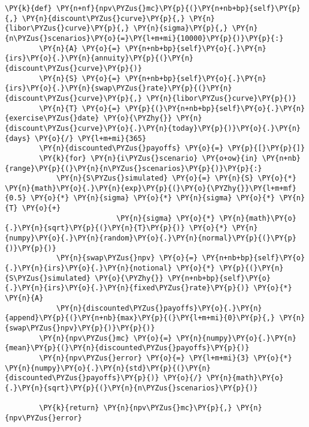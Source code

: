 \begin{Answer}
\begin{tcolorbox}[size=fbox, boxrule=1pt, colback=cellbackground, colframe=cellborder]
\begin{Verbatim}[commandchars=\\\{\}]
    \PY{k}{def} \PY{n+nf}{npv\PYZus{}mc}\PY{p}{(}\PY{n+nb+bp}{self}\PY{p}{,} \PY{n}{discount\PYZus{}curve}\PY{p}{,} \PY{n}{libor\PYZus{}curve}\PY{p}{,} \PY{n}{sigma}\PY{p}{,} \PY{n}{n\PYZus{}scenarios}\PY{o}{=}\PY{l+m+mi}{10000}\PY{p}{)}\PY{p}{:}
        \PY{n}{A} \PY{o}{=} \PY{n+nb+bp}{self}\PY{o}{.}\PY{n}{irs}\PY{o}{.}\PY{n}{annuity}\PY{p}{(}\PY{n}{discount\PYZus{}curve}\PY{p}{)}
        \PY{n}{S} \PY{o}{=} \PY{n+nb+bp}{self}\PY{o}{.}\PY{n}{irs}\PY{o}{.}\PY{n}{swap\PYZus{}rate}\PY{p}{(}\PY{n}{discount\PYZus{}curve}\PY{p}{,} \PY{n}{libor\PYZus{}curve}\PY{p}{)}
        \PY{n}{T} \PY{o}{=} \PY{p}{(}\PY{n+nb+bp}{self}\PY{o}{.}\PY{n}{exercise\PYZus{}date} \PY{o}{\PYZhy{}} \PY{n}{discount\PYZus{}curve}\PY{o}{.}\PY{n}{today}\PY{p}{)}\PY{o}{.}\PY{n}{days} \PY{o}{/} \PY{l+m+mi}{365}
        \PY{n}{discounted\PYZus{}payoffs} \PY{o}{=} \PY{p}{[}\PY{p}{]}
        \PY{k}{for} \PY{n}{i\PYZus{}scenario} \PY{o+ow}{in} \PY{n+nb}{range}\PY{p}{(}\PY{n}{n\PYZus{}scenarios}\PY{p}{)}\PY{p}{:}
            \PY{n}{S\PYZus{}simulated} \PY{o}{=} \PY{n}{S} \PY{o}{*} \PY{n}{math}\PY{o}{.}\PY{n}{exp}\PY{p}{(}\PY{o}{\PYZhy{}}\PY{l+m+mf}{0.5} \PY{o}{*} \PY{n}{sigma} \PY{o}{*} \PY{n}{sigma} \PY{o}{*} \PY{n}{T} \PY{o}{+}
                          \PY{n}{sigma} \PY{o}{*} \PY{n}{math}\PY{o}{.}\PY{n}{sqrt}\PY{p}{(}\PY{n}{T}\PY{p}{)} \PY{o}{*} \PY{n}{numpy}\PY{o}{.}\PY{n}{random}\PY{o}{.}\PY{n}{normal}\PY{p}{(}\PY{p}{)}\PY{p}{)}
            \PY{n}{swap\PYZus{}npv} \PY{o}{=} \PY{n+nb+bp}{self}\PY{o}{.}\PY{n}{irs}\PY{o}{.}\PY{n}{notional} \PY{o}{*} \PY{p}{(}\PY{n}{S\PYZus{}simulated} \PY{o}{\PYZhy{}} \PY{n+nb+bp}{self}\PY{o}{.}\PY{n}{irs}\PY{o}{.}\PY{n}{fixed\PYZus{}rate}\PY{p}{)} \PY{o}{*} \PY{n}{A}
            \PY{n}{discounted\PYZus{}payoffs}\PY{o}{.}\PY{n}{append}\PY{p}{(}\PY{n+nb}{max}\PY{p}{(}\PY{l+m+mi}{0}\PY{p}{,} \PY{n}{swap\PYZus{}npv}\PY{p}{)}\PY{p}{)}
        \PY{n}{npv\PYZus{}mc} \PY{o}{=} \PY{n}{numpy}\PY{o}{.}\PY{n}{mean}\PY{p}{(}\PY{n}{discounted\PYZus{}payoffs}\PY{p}{)}
        \PY{n}{npv\PYZus{}error} \PY{o}{=} \PY{l+m+mi}{3} \PY{o}{*} \PY{n}{numpy}\PY{o}{.}\PY{n}{std}\PY{p}{(}\PY{n}{discounted\PYZus{}payoffs}\PY{p}{)} \PY{o}{/} \PY{n}{math}\PY{o}{.}\PY{n}{sqrt}\PY{p}{(}\PY{n}{n\PYZus{}scenarios}\PY{p}{)}
        
        \PY{k}{return} \PY{n}{npv\PYZus{}mc}\PY{p}{,} \PY{n}{npv\PYZus{}error}
\end{Verbatim}
\end{tcolorbox}
\end{Answer}

